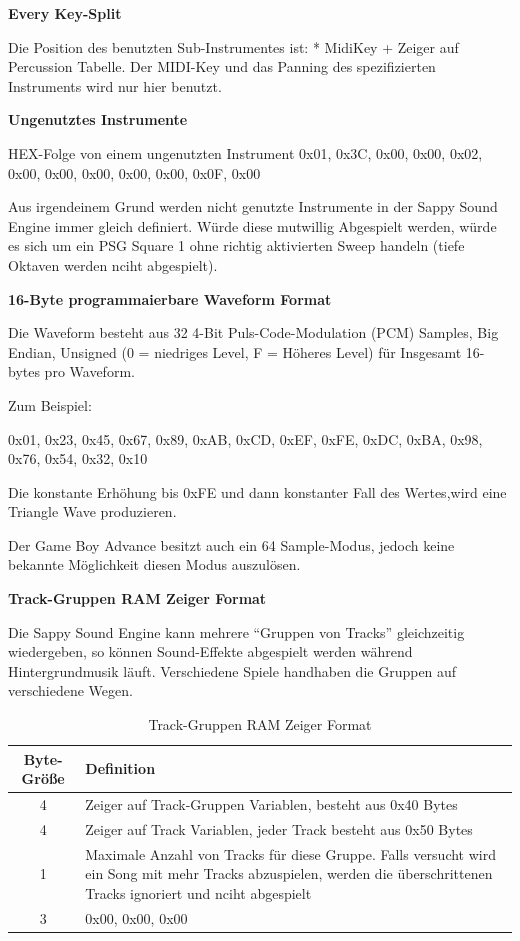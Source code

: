 \documentclass[11pt,a4paper]{scrartcl}
\newcommand{\paratitle}[1] {
    \vspace{5mm}
    \large \textbf{#1} \normalsize
    \vspace{2mm}\newline
}
\begin{document}
\paratitle{Every Key-Split}
Die Position des benutzten Sub-Instrumentes ist: * MidiKey + Zeiger auf Percussion Tabelle.\newline
Der MIDI-Key und das Panning des spezifizierten Instruments wird nur hier benutzt.


\paratitle{Ungenutztes Instrumente}
HEX-Folge von einem ungenutzten Instrument
0x01, 0x3C, 0x00, 0x00, 0x02, 0x00, 0x00, 0x00, 0x00, 0x00, 0x0F, 0x00

Aus irgendeinem Grund werden nicht genutzte Instrumente in der Sappy Sound Engine immer gleich definiert. W\"urde diese mutwillig Abgespielt werden, w\"urde es sich um ein PSG Square 1 ohne richtig aktivierten Sweep handeln (tiefe Oktaven werden nciht abgespielt).
		
\paratitle{\large 16-Byte programmaierbare Waveform Format}
Die Waveform besteht aus 32 4-Bit Puls-Code-Modulation (PCM) Samples, Big Endian, Unsigned (0 = niedriges Level, F = H\"oheres Level) f\"ur Insgesamt 16-bytes pro Waveform.

Zum Beispiel:

0x01, 0x23, 0x45, 0x67, 0x89, 0xAB, 0xCD, 0xEF, 0xFE, 0xDC, 0xBA, 0x98, 0x76, 0x54, 0x32, 0x10

Die konstante Erh\"ohung bis 0xFE und dann konstanter Fall des Wertes,wird eine Triangle Wave produzieren.

Der Game Boy Advance besitzt auch ein 64 Sample-Modus, jedoch keine bekannte M\"oglichkeit diesen Modus auszul\"osen.

\newpage
\paratitle{Track-Gruppen RAM Zeiger Format}
Die Sappy Sound Engine kann mehrere \enquote{Gruppen von Tracks} gleichzeitig wiedergeben, so k\"onnen Sound-Effekte abgespielt werden w\"ahrend Hintergrundmusik l\"auft. Verschiedene Spiele handhaben die Gruppen auf verschiedene Wegen.

\begin{table}[h]
    \centering
    \begin{tabular}{ c | p{15cm} }
        \textbf{Byte-Gr\"o{\ss}e} & \textbf{Definition}\\
        \hline
        4 & Zeiger auf Track-Gruppen Variablen, besteht aus 0x40 Bytes\\
				\hline
        4 & Zeiger auf Track Variablen, jeder Track besteht aus 0x50 Bytes\\
				\hline
        1 & Maximale Anzahl von Tracks f\"ur diese Gruppe. Falls versucht wird ein Song mit mehr Tracks abzuspielen, werden die \"uberschrittenen Tracks ignoriert und nciht abgespielt\\
				\hline
        3 & 0x00, 0x00, 0x00\\
    \end{tabular}
    \caption{Track-Gruppen RAM Zeiger Format}
    \label{table:RAMZeiger}
\end{table}
\end{document}
